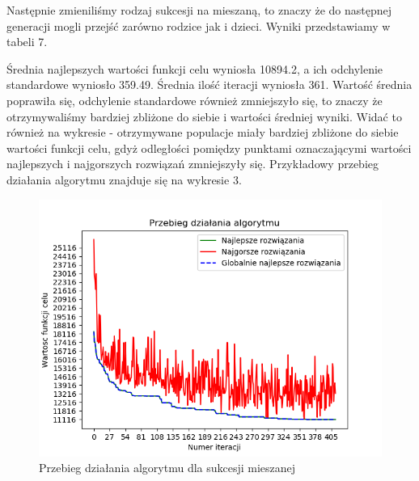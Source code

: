 \documentclass[12pt]{article}
\begin{document}
\par
Następnie zmieniliśmy rodzaj sukcesji na mieszaną, to znaczy że do następnej generacji mogli przejść zarówno rodzice jak i dzieci. Wyniki przedstawiamy w tabeli 7.
\begin{table}[H]
\caption{Wyniki testów dla sukcesji mieszanej}
\begin{center}
\end{center}
\end{table}
Średnia najlepszych wartości funkcji celu wyniosła 10894.2, a ich odchylenie standardowe wyniosło 359.49. Średnia ilość iteracji wyniosła 361. Wartość średnia poprawiła się, odchylenie standardowe również zmniejszyło się, to znaczy że otrzymywaliśmy bardziej zbliżone do siebie i wartości średniej wyniki. Widać to również na wykresie - otrzymywane populacje miały bardziej zbliżone do siebie wartości funkcji celu, gdyż odległości pomiędzy punktami oznaczającymi wartości najlepszych i najgorszych rozwiązań zmniejszyły się. Przykładowy przebieg działania algorytmu znajduje się na wykresie 3.
\begin{figure}[H]
\caption{Przebieg działania algorytmu dla sukcesji mieszanej}
\includegraphics{mixed_succession3.png}
\end{figure}
\end{document}
